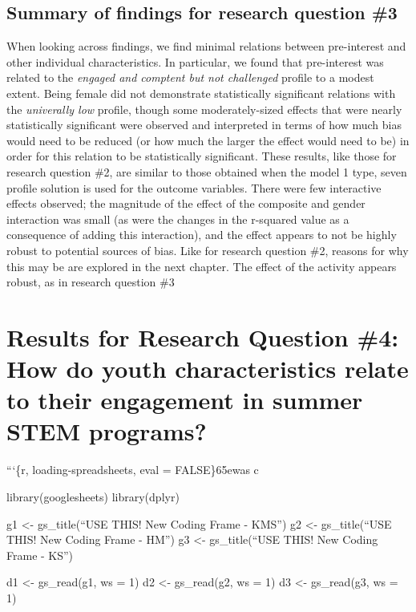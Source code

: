 \documentclass[]{msu-thesis}
\theoremstyle{definition}
\theoremstyle{definition}
\theoremstyle{definition}
\theoremstyle{remark}
\begin{document}
\subsection{Summary of findings for research question
\#3}\label{summary-of-findings-for-research-question-3}

When looking across findings, we find minimal relations between
pre-interest and other individual characteristics. In particular, we
found that pre-interest was related to the \emph{engaged and comptent
but not challenged} profile to a modest extent. Being female did not
demonstrate statistically significant relations with the
\emph{univerally low} profile, though some moderately-sized effects that
were nearly statistically significant were observed and interpreted in
terms of how much bias would need to be reduced (or how much the larger
the effect would need to be) in order for this relation to be
statistically significant. These results, like those for research
question \#2, are similar to those obtained when the model 1 type, seven
profile solution is used for the outcome variables. There were few
interactive effects observed; the magnitude of the effect of the
composite and gender interaction was small (as were the changes in the
r-squared value as a consequence of adding this interaction), and the
effect appears to not be highly robust to potential sources of bias.
Like for research question \#2, reasons for why this may be are explored
in the next chapter. The effect of the activity appears robust, as in
research question \#3

\section{Results for Research Question \#4: How do youth characteristics
relate to their engagement in summer STEM
programs?}\label{results-for-research-question-4-how-do-youth-characteristics-relate-to-their-engagement-in-summer-stem-programs}

```\{r, loading-spreadsheets, eval = FALSE\}65ewas c

library(googlesheets) library(dplyr)

g1 \textless{}- gs\_title(``USE THIS! New Coding Frame - KMS'') g2
\textless{}- gs\_title(``USE THIS! New Coding Frame - HM'') g3
\textless{}- gs\_title(``USE THIS! New Coding Frame - KS'')

d1 \textless{}- gs\_read(g1, ws = 1) d2 \textless{}- gs\_read(g2, ws =
1) d3 \textless{}- gs\_read(g3, ws = 1)
\end{document}
